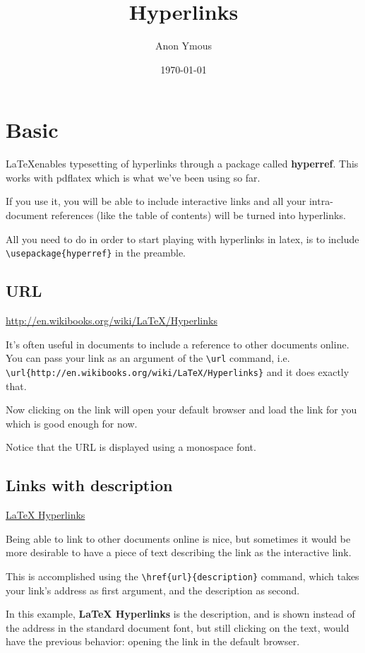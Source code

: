 \documentclass[a4paper]{article}
\author{Anon Ymous}
\date{\today}
\title{Hyperlinks}
\begin{document}
\maketitle
\tableofcontents

\section{Basic}
\LaTeX enables typesetting of hyperlinks through a package called
\textbf{hyperref}.
This works with pdflatex which is what we've been using so far.

If you use it, you will be able to include interactive links and all your
intra-document references (like the table of contents) will be turned into
hyperlinks.

All you need to do in order to start playing with hyperlinks in latex, is to
include \verb`\usepackage{hyperref}` in the preamble.

\subsection{URL}
\url{http://en.wikibooks.org/wiki/LaTeX/Hyperlinks}

It's often useful in documents to include a reference to other documents online.
You can pass your link as an argument of the \verb`\url` command, i.e.
\verb`\url{http://en.wikibooks.org/wiki/LaTeX/Hyperlinks}` and it does
exactly that.

Now clicking on the link will open your default browser and load the link for
you which is good enough for now.

Notice that the URL is displayed using a monospace font.


\subsection{Links with description}
\href{http://en.wikibooks.org/wiki/LaTeX/Hyperlinks}{\LaTeX{} Hyperlinks}

Being able to link to other documents online is nice, but sometimes it would
be more desirable to have a piece of text describing the link as the
interactive link.

This is accomplished using the \verb`\href{url}{description}` command, which
takes your link's address as first argument, and the description as second.

In this example, \textbf{\LaTeX{} Hyperlinks} is the description,
and is shown instead of the address in the standard document font, but still
clicking on the text, would have the previous behavior: opening the link in the default browser.
\end{document}
